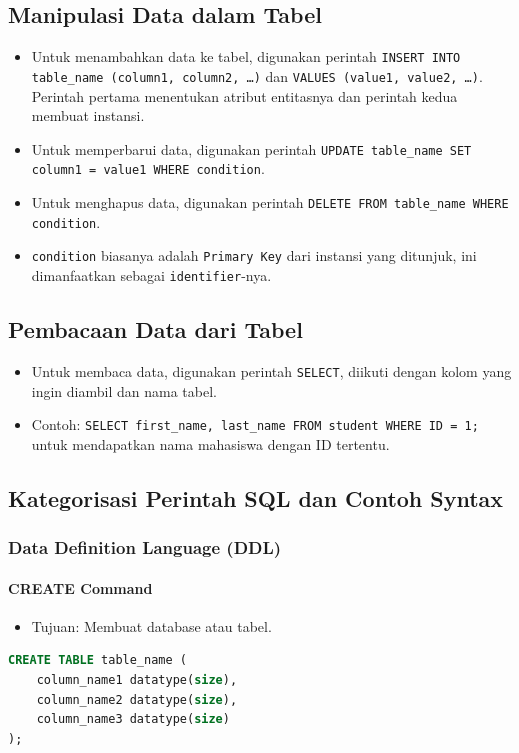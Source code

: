 \documentclass{article}
\begin{document}
\subsection{Manipulasi Data dalam Tabel}
\begin{itemize}
    \item Untuk menambahkan data ke tabel, digunakan perintah \texttt{INSERT INTO table\_name (column1, column2, \ldots)} dan \texttt{VALUES (value1, value2, \ldots)}. Perintah pertama menentukan atribut entitasnya dan perintah kedua membuat instansi.
    \item Untuk memperbarui data, digunakan perintah \texttt{UPDATE table\_name SET column1 = value1 WHERE condition}.
    \item Untuk menghapus data, digunakan perintah \texttt{DELETE FROM table\_name WHERE condition}.
    \item \texttt{condition} biasanya adalah \texttt{Primary Key} dari instansi yang ditunjuk, ini dimanfaatkan sebagai \texttt{identifier}-nya.
\end{itemize}

\subsection{Pembacaan Data dari Tabel}
\begin{itemize}
    \item Untuk membaca data, digunakan perintah \texttt{SELECT}, diikuti dengan kolom yang ingin diambil dan nama tabel.
    \item Contoh: \texttt{SELECT first\_name, last\_name FROM student WHERE ID = 1;} untuk mendapatkan nama mahasiswa dengan ID tertentu.
\end{itemize}

\subsection{Kategorisasi Perintah SQL dan Contoh Syntax}

\subsubsection{Data Definition Language (DDL)}
\paragraph{CREATE Command}
\begin{itemize}
    \item Tujuan: Membuat database atau tabel.
\end{itemize}
\begin{lstlisting}[language=SQL, caption={Sintaks CREATE Command}, captionpos=b]
CREATE TABLE table_name (  
	column_name1 datatype(size),  
	column_name2 datatype(size),  
	column_name3 datatype(size)  
);
\end{lstlisting}
\end{document}
